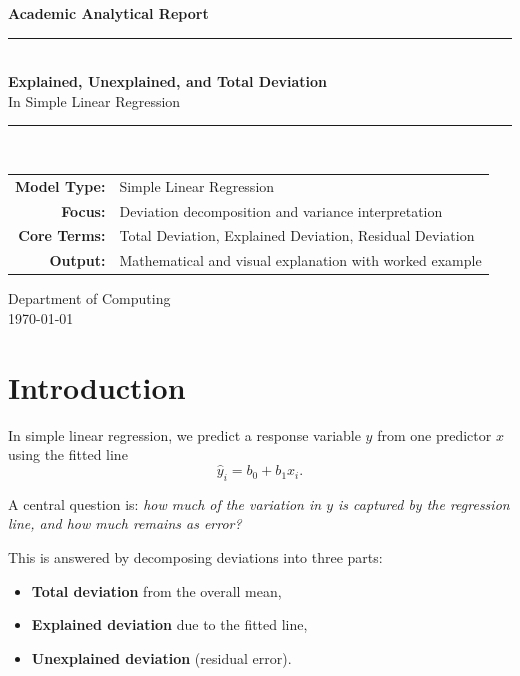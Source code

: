 \documentclass[12pt,a4paper]{article}
\begin{document}
\begin{titlepage}
\centering
\vspace*{0.5cm}
{\Large\color{primary}\textbf{Academic Analytical Report}}\\[0.3cm]
\rule{\textwidth}{1.8pt}\\[0.5cm]
{\Huge\bfseries\color{primary}Explained, Unexplained, and Total Deviation}\\[0.2cm]
{\Large In Simple Linear Regression}\\[0.4cm]
\rule{\textwidth}{1.8pt}\\[1.0cm]

\begin{tabular}{rl}
\textbf{Model Type:} & Simple Linear Regression \\
\textbf{Focus:} & Deviation decomposition and variance interpretation \\
\textbf{Core Terms:} & Total Deviation, Explained Deviation, Residual Deviation \\
\textbf{Output:} & Mathematical and visual explanation with worked example
\end{tabular}

\vfill
{\large Department of Computing}\\
{\large \today}
\end{titlepage}

\tableofcontents
\newpage

\section{Introduction}

In simple linear regression, we predict a response variable $y$ from one predictor $x$ using the fitted line
\begin{equation}
\hat{y}_i = b_0 + b_1 x_i.
\end{equation}

A central question is: \textit{how much of the variation in $y$ is captured by the regression line, and how much remains as error?}

This is answered by decomposing deviations into three parts:
\begin{itemize}[noitemsep]
    \item \textbf{Total deviation} from the overall mean,
    \item \textbf{Explained deviation} due to the fitted line,
    \item \textbf{Unexplained deviation} (residual error).
\end{itemize}
\end{document}
